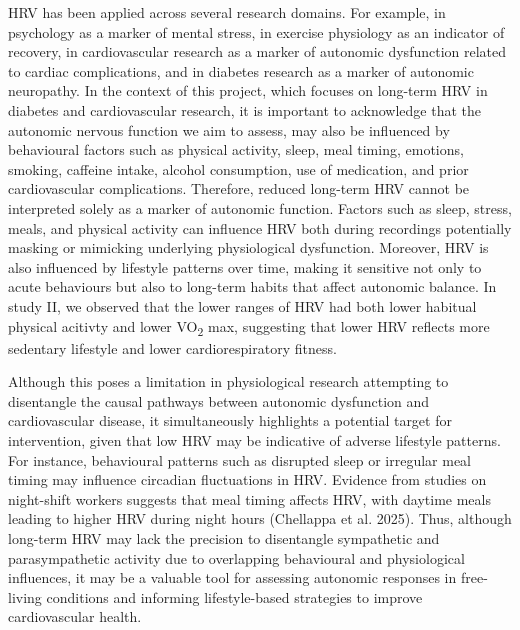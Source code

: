 \documentclass[
  a4paper,
  headsepline=true,
  open=any]{scrbook}
\begin{document}
HRV has been applied across several research domains. For example, in
psychology as a marker of mental stress, in exercise physiology as an
indicator of recovery, in cardiovascular research as a marker of
autonomic dysfunction related to cardiac complications, and in diabetes
research as a marker of autonomic neuropathy. In the context of this
project, which focuses on long-term HRV in diabetes and cardiovascular
research, it is important to acknowledge that the autonomic nervous
function we aim to assess, may also be influenced by behavioural factors
such as physical activity, sleep, meal timing, emotions, smoking,
caffeine intake, alcohol consumption, use of medication, and prior
cardiovascular complications. Therefore, reduced long-term HRV cannot be
interpreted solely as a marker of autonomic function. Factors such as
sleep, stress, meals, and physical activity can influence HRV both
during recordings potentially masking or mimicking underlying
physiological dysfunction. Moreover, HRV is also influenced by lifestyle
patterns over time, making it sensitive not only to acute behaviours but
also to long-term habits that affect autonomic balance. In study II, we
observed that the lower ranges of HRV had both lower habitual physical
acitivty and lower VO\textsubscript{2} max, suggesting that lower HRV
reflects more sedentary lifestyle and lower cardiorespiratory fitness.

Although this poses a limitation in physiological research attempting to
disentangle the causal pathways between autonomic dysfunction and
cardiovascular disease, it simultaneously highlights a potential target
for intervention, given that low HRV may be indicative of adverse
lifestyle patterns. For instance, behavioural patterns such as disrupted
sleep or irregular meal timing may influence circadian fluctuations in
HRV. Evidence from studies on night-shift workers suggests that meal
timing affects HRV, with daytime meals leading to higher HRV during
night hours (Chellappa et al. 2025). Thus, although long-term HRV may
lack the precision to disentangle sympathetic and parasympathetic
activity due to overlapping behavioural and physiological influences, it
may be a valuable tool for assessing autonomic responses in free-living
conditions and informing lifestyle-based strategies to improve
cardiovascular health.
\end{document}
